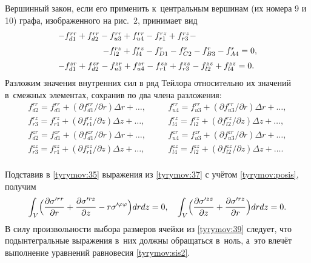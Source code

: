 Вершинный закон, если его применить к~центральным вершинам (их номера 9 и 10) графа, изображенного на рис.~2, принимает вид
\begin{equation}\label{tyrymov:35}
\begin{array}{l}
    -f_{d1}^{rr}+f_{d2}^{rr}-f_{u3}^{rr}+f_{u4}^{rr} -f_{r1}^{rz}+ f_{r3}^{rz} - \\[2mm] 
    \hspace{1.85cm} -f_{l2}^{rz}+f_{l4}^{rz}
    -f_{D1}^{r}-f_{C2}^{r}-f_{B3}^{r}-f_{A4}^{r}=0, \\[2mm]
    -f_{d1}^{zr}+f_{d2}^{zr}-f_{u3}^{zr}+f_{u4}^{zr} -f_{r1}^{zz}+f_{r3}^{zz}-f_{l2}^{zz}+f_{l4}^{zz}=0.
    \end{array}
\end{equation}
Разложим значения внутренних сил в ряд Тейлора относительно их значений в~смежных элементах, сохранив по два члена разложения:
\begin{equation}\label{tyrymov:37}
    \begin{array}{lll}
      f_{d2}^{rr}=f_{d1}^{rr}+(\partial f_{d1}^{rr}/\partial r)\Delta r+\ldots ,& \quad  &
      f_{u4}^{rr}=f_{u3}^{rr}+(\partial f_{u3}^{rr}/\partial r)\Delta r+\ldots ,\\
     f_{r3}^{rz}=f_{r1}^{rz}+(\partial f_{r1}^{rz}/\partial z)\Delta z+\ldots ,& &
        f_{l4}^{rz}=f_{l2}^{rz}+(\partial f_{l2}^{rz}/\partial z)\Delta z+\ldots, \\
      f_{d2}^{zr}=f_{d1}^{zr}+(\partial f_{d1}^{zr}/\partial r)\Delta r+\ldots ,& &
      f_{u4}^{zr}=f_{u3}^{zr}+(\partial f_{u3}^{zr}/\partial r)\Delta r+\ldots, \\
     f_{r3}^{zz}=f_{r1}^{zz}+(\partial f_{r1}^{zz}/\partial z)\Delta z+\ldots ,& &
        f_{l4}^{zz}=f_{l2}^{zz}+(\partial f_{l2}^{zz}/\partial z)\Delta z+\ldots. \\
         \end{array}
\end{equation}

Подставив в \eqref{tyrymov:35}  выражения из \eqref{tyrymov:37} с учётом \eqref{tyrymov:posis}, получим
\begin{gather}
\label{tyrymov:39}
    \int_V\Bigl(\frac{\partial \sigma'^{rr}}{\partial r} + \frac{\partial \sigma'^{rz}}{\partial z }-r\sigma'^{\varphi\varphi}\Bigr)drdz=0,
\quad 
    \int_V\Bigl( \frac{\partial \sigma'^{zz}}{\partial z} + \frac{\partial \sigma'^{rz}}{\partial r} \Bigr) drdz=0.
\end{gather}
В силу произвольности выбора размеров ячейки из \eqref{tyrymov:39} следует, что подынтегральные выражения в~них должны
обращаться в~ноль, а~это влечёт выполнение уравнений равновесия \eqref{tyrymov:sis2}.

